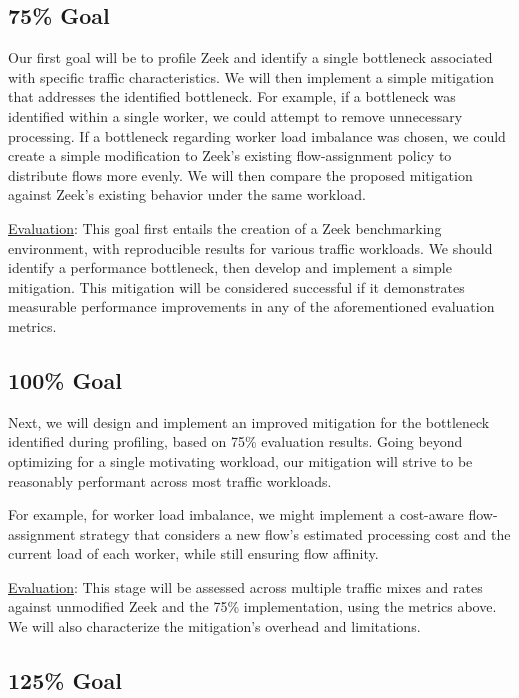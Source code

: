 \documentclass[sigconf, 10pt, nonacm]{acmart}
\begin{document}
\subsection{75\% Goal}

Our first goal will be to profile Zeek and identify a 
single bottleneck associated with specific traffic 
characteristics. We will then implement a simple mitigation that addresses 
the identified bottleneck. For example, if a bottleneck was identified within a single 
worker, we could attempt to remove unnecessary processing. If 
a bottleneck regarding worker load imbalance was chosen, we could create a 
simple modification to Zeek’s existing flow-assignment policy to distribute 
flows more evenly. We will then compare the proposed mitigation against Zeek’s 
existing behavior under the same workload. 

\underline{Evaluation}: This goal first entails the creation of a Zeek benchmarking 
environment, with reproducible results for various traffic workloads. We should identify a 
performance bottleneck, then develop and implement a simple mitigation.
This mitigation will be considered successful if it demonstrates measurable 
performance improvements in any of the aforementioned evaluation metrics.

\subsection{100\% Goal}

Next, we will design and implement an improved 
mitigation for the bottleneck identified during profiling, based on 75\% evaluation results. Going beyond optimizing for 
a single motivating workload, our mitigation will strive to be reasonably 
performant across most traffic workloads.

For example, for worker load imbalance, we might
implement a cost-aware flow-assignment strategy that considers a new flow’s 
estimated processing cost and the current load of each worker, while still ensuring 
flow affinity.

\underline{Evaluation}: This stage will be assessed across multiple traffic mixes
and rates against unmodified Zeek and the 75\% implementation, using the metrics
above. We will also characterize the mitigation's overhead and limitations.

\subsection{125\% Goal}
\end{document}
